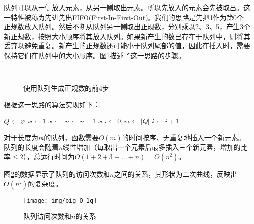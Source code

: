 \documentclass[b5paper]{ctexart}
\begin{document}
队列可以从一侧放入元素，从另一侧取出元素。所以先放入的元素会先被取出。这一特性被称为先进先出FIFO(First-In-First-Out)。我们的思路是先把1作为第0个正规数放入队列。然后不断从队列另一侧取出正规数，分别乘以2、3、5，产生3个新正规数，按照大小顺序将其放入队列。如果新产生的数已存在于队列中，则将其丢弃以避免重复。新产生的正规数还可能小于队列尾部的值，因此在插入时，需要保持它们在队列中的大小顺序。图\ref{fig:queues}描述了这一思路的步骤。

\begin{figure}[htbp]
  \centering
  \hspace{.1\textwidth}
  \\
  \hspace{.1\textwidth}
  \caption{使用队列生成正规数的前4步} \label{fig:queues}
\end{figure}

根据这一思路的算法实现如下：

\begin{algorithmic}[1]
  \State $Q \gets \varnothing$
  \State $x \gets 1$
  \State {}
    \State $x \gets$ 
    \State {}
    \State {}
    \State {}
    \State $n \gets n-1$
  \EndWhile
  \State \Return $x$
\EndFunction
\Statex
{}
  \State $i \gets 0, m \gets |Q|$
    \State $i \gets i + 1$
  \EndWhile
    \State {}
  \EndIf
\EndFunction
\end{algorithmic}

对于长度为$m$的队列，函数需要$O(m)$的时间按序、无重复地插入一个新元素。队列的长度会随着$n$线性增加（每取出一个元素后最多插入三个新元素，增加的比率$\leq 2$），总运行时间为$O(1 + 2 + 3 + ... + n) = O(n^2)$。

图\ref{fig:big-O-1q}的数据显示了队列的访问次数和$n$之间的关系，其形状为二次曲线，反映出$O(n^2)$的复杂度。

\begin{figure}[htbp]
  \centering
  \texttt{[image: img/big-O-1q]}
  \caption{队列访问次数和$n$的关系} \label{fig:big-O-1q}
\end{figure}
\end{document}
